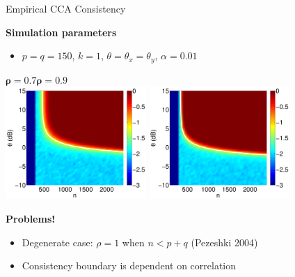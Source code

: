 \documentclass[8pt]{beamer}
\begin{document}
\begin{frame}{Empirical CCA Consistency}

  \textbf{Simulation parameters}
  \begin{itemize}
  \item $p=q=150$, $k=1$, $\theta=\theta_x=\theta_y$, $\alpha=0.01$
  \end{itemize}

  \vspace{1ex}

  \begin{center}  $\boldsymbol{\rho=}\mathbf{0.7}$\hspace{25ex}$\boldsymbol{\rho=0.9}$\\[0.5ex]
  \includegraphics[width=0.4\textwidth]{figures/cca_rho_noicca_7.pdf}\hspace{2ex}
  \includegraphics[width=0.4\textwidth]{figures/cca_rho_noicca_9.pdf}
\end{center}



  
  \textbf{Problems!}
  \begin{itemize}
  \item Degenerate case: $\rho=1$ when $n<p+q$ (Pezeshki 2004)
  \item Consistency boundary is dependent on correlation
  \end{itemize}

\end{frame}
\end{document}
